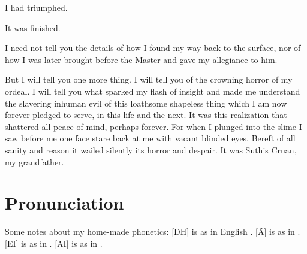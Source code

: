 \documentclass
  [a4paper,
   12pt,
   oneside
  ]%
  {article}
\begin{document}
I had triumphed. 

It was finished. 

I need not tell you the details of how I found my way back to the surface, nor of how I was later brought before the Master and gave my allegiance to him.

But I will tell you one more thing. 
I will tell you of the crowning horror of my ordeal. 
I will tell you what sparked my flash of insight and made me understand the slavering inhuman evil of this loathsome shapeless thing which I am now forever pledged to serve, in this life and the next. 
It was this realization that shattered all peace of mind, perhaps forever. 
For when I plunged into the slime I saw before me one face stare back at me with vacant blinded eyes. 
Bereft of all sanity and reason it wailed silently its horror and despair.
It was Suthis Cruan, my grandfather. 









\newpage
\appendix
\section{Pronunciation}
Some notes about my home-made phonetics: 
[DH] is as in English . 
[Ä] is as in .
[EI] is as in .
[AI] is as in . 

\begin{pronunciationenvironment}{
}
\end{pronunciationenvironment}
\end{document}
